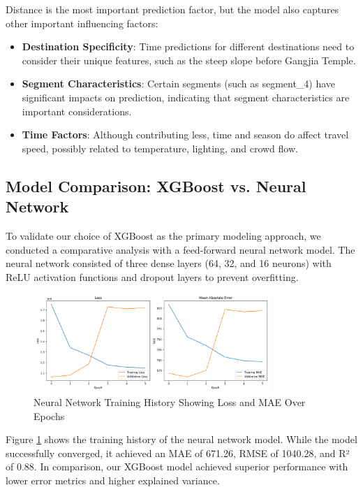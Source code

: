 \documentclass[12pt]{article}
\begin{document}
Distance is the most important prediction factor, but the model also captures other important influencing factors:

\begin{itemize}
  \item \textbf{Destination Specificity}: Time predictions for different destinations need to consider their unique features, such as the steep slope before Gangjia Temple.
  \item \textbf{Segment Characteristics}: Certain segments (such as segment\_4) have significant impacts on prediction, indicating that segment characteristics are important considerations.
  \item \textbf{Time Factors}: Although contributing less, time and season do affect travel speed, possibly related to temperature, lighting, and crowd flow.
\end{itemize}

\subsection{Model Comparison: XGBoost vs. Neural Network}

To validate our choice of XGBoost as the primary modeling approach, we conducted a comparative analysis with a feed-forward neural network model. The neural network consisted of three dense layers (64, 32, and 16 neurons) with ReLU activation functions and dropout layers to prevent overfitting.

\begin{figure}[H]
\centering
\includegraphics[width=0.8\textwidth]{nn_results/training_history.png}
\caption{Neural Network Training History Showing Loss and MAE Over Epochs}
\label{fig:nn_training}
\end{figure}

Figure \ref{fig:nn_training} shows the training history of the neural network model. While the model successfully converged, it achieved an MAE of 671.26, RMSE of 1040.28, and R² of 0.88. In comparison, our XGBoost model achieved superior performance with lower error metrics and higher explained variance.
\end{document}
